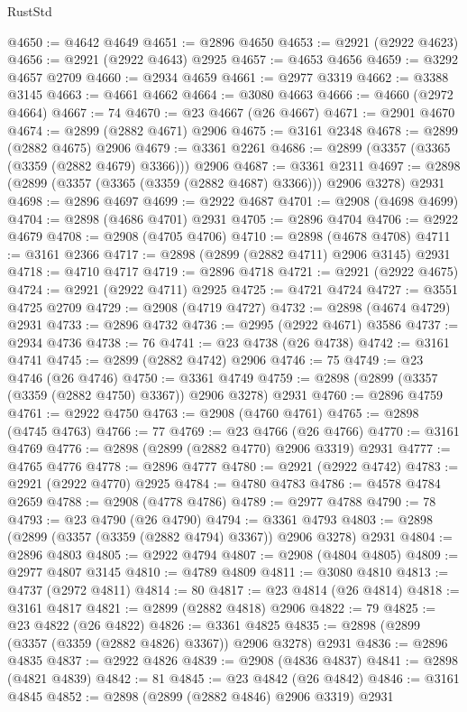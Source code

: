 \begin{lexlean}{RustStd}
\begin{coremodule}
@4650 := @4642 @4649
@4651 := @2896 @4650
@4653 := @2921 (@2922 @4623)
@4656 := @2921 (@2922 @4643) @2925
@4657 := @4653 @4656
@4659 := @3292 @4657 @2709
@4660 := @2934 @4659
@4661 := @2977 @3319
@4662 := @3388 @3145
@4663 := @4661 @4662
@4664 := @3080 @4663
@4666 := @4660 (@2972 @4664)
@4667 := 74
@4670 := @23 @4667 (@26 @4667)
@4671 := @2901 @4670
@4674 := @2899 (@2882 @4671) @2906
@4675 := @3161 @2348
@4678 := @2899 (@2882 @4675) @2906
@4679 := @3361 @2261
@4686 := @2899 (@3357 (@3365 (@3359 (@2882 @4679) @3366))) @2906
@4687 := @3361 @2311
@4697 := @2898 (@2899 (@3357 (@3365 (@3359 (@2882 @4687) @3366))) @2906 @3278) @2931
@4698 := @2896 @4697
@4699 := @2922 @4687
@4701 := @2908 (@4698 @4699)
@4704 := @2898 (@4686 @4701) @2931
@4705 := @2896 @4704
@4706 := @2922 @4679
@4708 := @2908 (@4705 @4706)
@4710 := @2898 (@4678 @4708)
@4711 := @3161 @2366
@4717 := @2898 (@2899 (@2882 @4711) @2906 @3145) @2931
@4718 := @4710 @4717
@4719 := @2896 @4718
@4721 := @2921 (@2922 @4675)
@4724 := @2921 (@2922 @4711) @2925
@4725 := @4721 @4724
@4727 := @3551 @4725 @2709
@4729 := @2908 (@4719 @4727)
@4732 := @2898 (@4674 @4729) @2931
@4733 := @2896 @4732
@4736 := @2995 (@2922 @4671) @3586
@4737 := @2934 @4736
@4738 := 76
@4741 := @23 @4738 (@26 @4738)
@4742 := @3161 @4741
@4745 := @2899 (@2882 @4742) @2906
@4746 := 75
@4749 := @23 @4746 (@26 @4746)
@4750 := @3361 @4749
@4759 := @2898 (@2899 (@3357 (@3359 (@2882 @4750) @3367)) @2906 @3278) @2931
@4760 := @2896 @4759
@4761 := @2922 @4750
@4763 := @2908 (@4760 @4761)
@4765 := @2898 (@4745 @4763)
@4766 := 77
@4769 := @23 @4766 (@26 @4766)
@4770 := @3161 @4769
@4776 := @2898 (@2899 (@2882 @4770) @2906 @3319) @2931
@4777 := @4765 @4776
@4778 := @2896 @4777
@4780 := @2921 (@2922 @4742)
@4783 := @2921 (@2922 @4770) @2925
@4784 := @4780 @4783
@4786 := @4578 @4784 @2659
@4788 := @2908 (@4778 @4786)
@4789 := @2977 @4788
@4790 := 78
@4793 := @23 @4790 (@26 @4790)
@4794 := @3361 @4793
@4803 := @2898 (@2899 (@3357 (@3359 (@2882 @4794) @3367)) @2906 @3278) @2931
@4804 := @2896 @4803
@4805 := @2922 @4794
@4807 := @2908 (@4804 @4805)
@4809 := @2977 @4807 @3145
@4810 := @4789 @4809
@4811 := @3080 @4810
@4813 := @4737 (@2972 @4811)
@4814 := 80
@4817 := @23 @4814 (@26 @4814)
@4818 := @3161 @4817
@4821 := @2899 (@2882 @4818) @2906
@4822 := 79
@4825 := @23 @4822 (@26 @4822)
@4826 := @3361 @4825
@4835 := @2898 (@2899 (@3357 (@3359 (@2882 @4826) @3367)) @2906 @3278) @2931
@4836 := @2896 @4835
@4837 := @2922 @4826
@4839 := @2908 (@4836 @4837)
@4841 := @2898 (@4821 @4839)
@4842 := 81
@4845 := @23 @4842 (@26 @4842)
@4846 := @3161 @4845
@4852 := @2898 (@2899 (@2882 @4846) @2906 @3319) @2931

\end{coremodule}
\end{lexlean}
